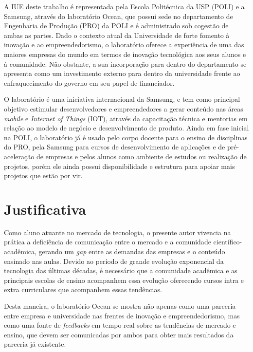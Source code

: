 A IUE deste trabalho é representada pela Escola Politécnica da USP (POLI) e a Samsung, através do laboratório Ocean, que possui sede no departamento de Engenharia de Produção (PRO) da POLI e é administrado sob cogestão de ambas as partes. Dado o contexto atual da Universidade de forte fomento à inovação e ao empreendedorismo, o laboratório oferece a experiência de uma das maiores empresas do mundo em termos de inovação tecnológica aos seus alunos e à comunidade. Não obstante, a sua incorporação para dentro do departamento se apresenta como um investimento externo para dentro da universidade frente ao enfraquecimento do governo em seu papel de financiador.

O laboratório é uma iniciativa internacional da Samsung, e tem como principal objetivo estimular desenvolvedores e empreendedores a gerar conteúdo nas áreas \textit{mobile} e \textit{Internet of Things} (IOT), através da capacitação técnica e mentorias em relação ao modelo de negócio e desenvolvimento de produto. Ainda em fase inicial na POLI, o laboratório já é usado pelo corpo docente para o ensino de disciplinas do PRO, pela Samsung para cursos de desenvolvimento de aplicações e de pré-aceleração de empresas e pelos alunos como ambiente de estudos ou realização de projetos, porém ele ainda possui disponibilidade e estrutura para apoiar mais projetos que estão por vir.

\section{Justificativa}
\label{cha:justificativa}

Como aluno atuante no mercado de tecnologia, o presente autor vivencia na prática a deficiência de comunicação entre o mercado e a comunidade científico-acadêmica, gerando um \textit{gap} entre as demandas das empresas e o conteúdo ensinado nas aulas. Devido ao período de grande evolução exponencial da tecnologia das últimas décadas, é necessário que a comunidade acadêmica e as principais escolas de ensino acompanhem essa evolução oferecendo cursos intra e extra curriculares que acompanhem essas tendências.

Desta maneira, o laboratório Ocean se mostra não apenas como uma parceria entre empresa e universidade nas frentes de inovação e empreendedorismo, mas como uma fonte de \textit{feedbacks} em tempo real sobre as tendências de mercado e ensino, que devem ser comunicadas por ambos para obter mais resultados da parceria já existente.

